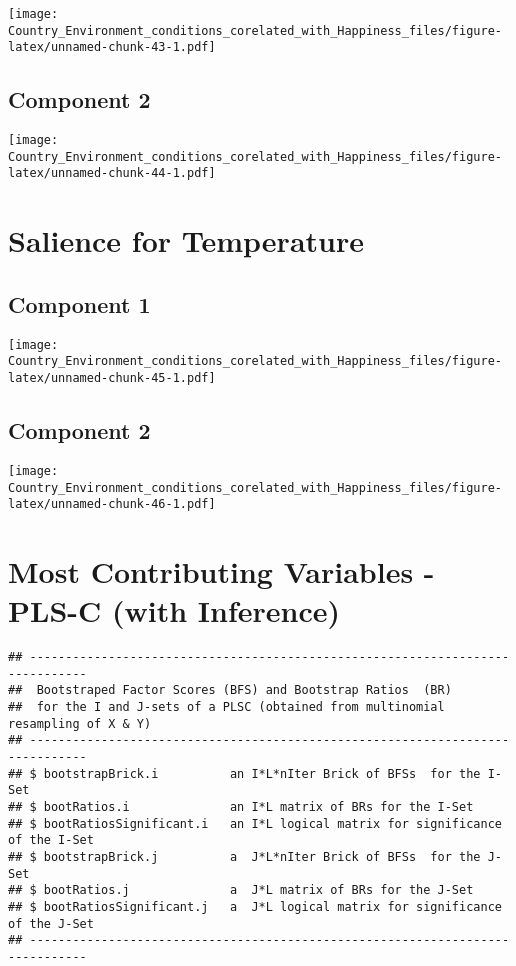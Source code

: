 \documentclass[]{book}
\begin{document}
\texttt{[image: Country\_Environment\_conditions\_corelated\_with\_Happiness\_files/figure-latex/unnamed-chunk-43-1.pdf]}

\hypertarget{component-2}{%
\subsection{Component 2}\label{component-2}}

\texttt{[image: Country\_Environment\_conditions\_corelated\_with\_Happiness\_files/figure-latex/unnamed-chunk-44-1.pdf]}

\hypertarget{salience-for-temperature}{%
\section{Salience for Temperature}\label{salience-for-temperature}}

\hypertarget{component-1}{%
\subsection{Component 1}\label{component-1}}

\texttt{[image: Country\_Environment\_conditions\_corelated\_with\_Happiness\_files/figure-latex/unnamed-chunk-45-1.pdf]}

\hypertarget{component-2-1}{%
\subsection{Component 2}\label{component-2-1}}

\texttt{[image: Country\_Environment\_conditions\_corelated\_with\_Happiness\_files/figure-latex/unnamed-chunk-46-1.pdf]}

\hypertarget{most-contributing-variables---pls-c-with-inference}{%
\section{Most Contributing Variables - PLS-C (with
Inference)}\label{most-contributing-variables---pls-c-with-inference}}

\begin{verbatim}
## ------------------------------------------------------------------------------
##  Bootstraped Factor Scores (BFS) and Bootstrap Ratios  (BR) 
##  for the I and J-sets of a PLSC (obtained from multinomial resampling of X & Y) 
## ------------------------------------------------------------------------------
## $ bootstrapBrick.i          an I*L*nIter Brick of BFSs  for the I-Set
## $ bootRatios.i              an I*L matrix of BRs for the I-Set
## $ bootRatiosSignificant.i   an I*L logical matrix for significance of the I-Set
## $ bootstrapBrick.j          a  J*L*nIter Brick of BFSs  for the J-Set
## $ bootRatios.j              a  J*L matrix of BRs for the J-Set
## $ bootRatiosSignificant.j   a  J*L logical matrix for significance of the J-Set
## ------------------------------------------------------------------------------
\end{verbatim}
\end{document}
